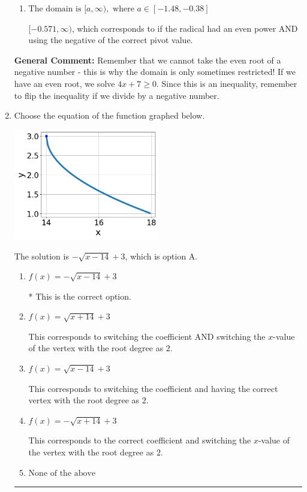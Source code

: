 \documentclass{extbook}[14pt]
\newcommand{\litem}[1]{\item #1

\rule{\textwidth}{0.4pt}}
\begin{document}
\begin{enumerate}
{\begin{enumerate}[label=\Alph*.]
$[-1.750, \infty)$, which corresponds to if the radical had an even power.
\item \( \text{The domain is } [a, \infty), \text{   where } a \in [-1.48, -0.38] \)

$[-0.571, \infty)$, which corresponds to if the radical had an even power AND using the negative of the correct pivot value.
\end{enumerate}

\textbf{General Comment:} Remember that we cannot take the even root of a negative number - this is why the domain is only sometimes restricted! If we have an even root, we solve $4 x + 7 \geq 0$. Since this is an inequality, remember to flip the inequality if we divide by a negative number.
}
\litem{
Choose the equation of the function graphed below.

\begin{center}
    \includegraphics[width=0.5\textwidth]{../Figures/radicalGraphToEquationCopyC.png}
\end{center}




The solution is \( - \sqrt{x - 14} + 3 \), which is option A.\begin{enumerate}[label=\Alph*.]
\item \( f(x) = - \sqrt{x - 14} + 3 \)

* This is the correct option.
\item \( f(x) = \sqrt{x + 14} + 3 \)

This corresponds to switching the coefficient AND switching the $x$-value of the vertex with the root degree as $2$.
\item \( f(x) = \sqrt{x - 14} + 3 \)

This corresponds to switching the coefficient and having the correct vertex with the root degree as $2$.
\item \( f(x) = - \sqrt{x + 14} + 3 \)

This corresponds to the correct coefficient and switching the $x$-value of the vertex with the root degree as $2$.
\item \( \text{None of the above} \)


\end{enumerate}}
\end{enumerate}
\end{document}
